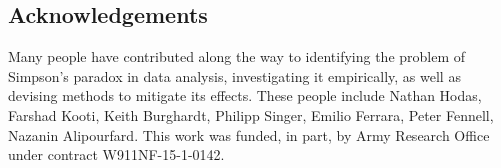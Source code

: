 \documentclass{svjour3}
\begin{document}
\subsection*{Acknowledgements}
Many people have contributed along the way to identifying the problem of Simpson's paradox in data analysis, investigating it empirically, as well as devising methods to mitigate its effects. These people include Nathan Hodas, Farshad Kooti, Keith Burghardt, Philipp Singer, Emilio Ferrara, Peter Fennell, Nazanin Alipourfard.
This work was funded, in part, by Army Research Office under contract W911NF-15-1-0142.


\end{document}
